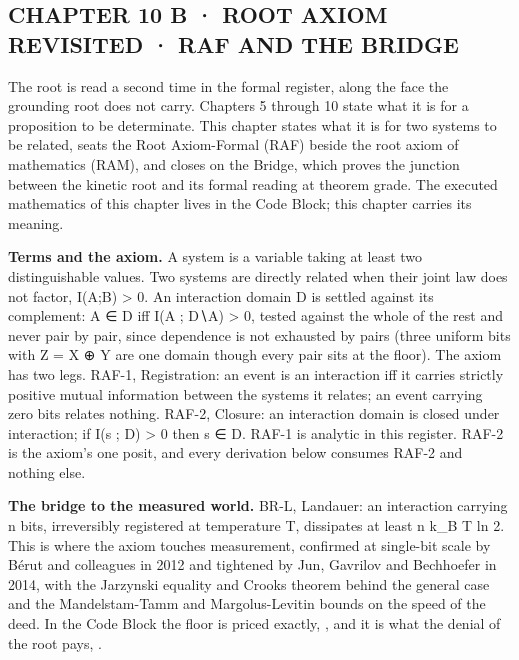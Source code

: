 \documentclass[10pt,twocolumn]{article}
\begin{document}
\hypertarget{chapter-10-b-root-axiom-revisited-raf-and-the-bridge}{%
\subsection{CHAPTER 10 B · ROOT AXIOM REVISITED · RAF AND THE
BRIDGE}\label{chapter-10-b-root-axiom-revisited-raf-and-the-bridge}}

The root is read a second time in the formal register, along the face
the grounding root does not carry. Chapters 5 through 10 state what it
is for a proposition to be determinate. This chapter states what it is
for two systems to be related, seats the Root Axiom-Formal (RAF) beside
the root axiom of mathematics (RAM), and closes on the Bridge, which
proves the junction between the kinetic root and its formal reading at
theorem grade. The executed mathematics of this chapter lives in the
Code Block; this chapter carries its meaning.

\textbf{Terms and the axiom.} A system is a variable taking at least two
distinguishable values. Two systems are directly related when their
joint law does not factor, I(A;B) \textgreater{} 0. An interaction
domain D is settled against its complement: A ∈ D iff I(A ; D∖A)
\textgreater{} 0, tested against the whole of the rest and never pair by
pair, since dependence is not exhausted by pairs (three uniform bits
with Z = X ⊕ Y are one domain though every pair sits at the floor). The
axiom has two legs. RAF-1, Registration: an event is an interaction iff
it carries strictly positive mutual information between the systems it
relates; an event carrying zero bits relates nothing. RAF-2, Closure: an
interaction domain is closed under interaction; if I(s ; D)
\textgreater{} 0 then s ∈ D. RAF-1 is analytic in this register. RAF-2
is the axiom's one posit, and every derivation below consumes RAF-2 and
nothing else.

\textbf{The bridge to the measured world.} BR-L, Landauer: an
interaction carrying n bits, irreversibly registered at temperature T,
dissipates at least n k\_B T ln 2. This is where the axiom touches
measurement, confirmed at single-bit scale by Bérut and colleagues in
2012 and tightened by Jun, Gavrilov and Bechhoefer in 2014, with the
Jarzynski equality and Crooks theorem behind the general case and the
Mandelstam-Tamm and Margolus-Levitin bounds on the speed of the deed. In
the Code Block the floor is priced exactly,
\texttt{}, and it is what the denial
of the root pays, \texttt{}.
\end{document}
